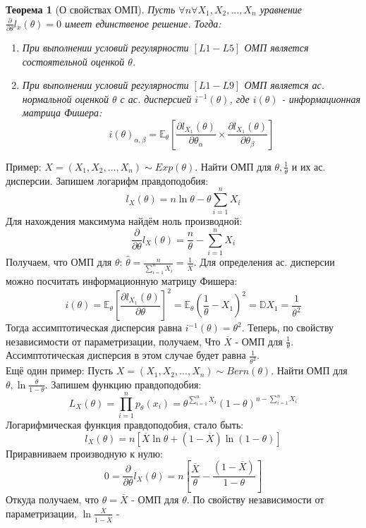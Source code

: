 \documentclass[a4paper,12pt]{article}
\newcommand{\expec}{\mathbb{E}}
\newcommand{\disp}{\mathbb{D}}
\newcommand{\sumin}{\sum\limits_{i=1}^n}
\newcommand{\prodin}{\prod\limits_{i=1}^n}
\newcommand{\sample}{X_1, X_2, ..., X_n}
\newcommand{\derb}[1]{\frac{\partial}{\partial #1}}
\theoremstyle{named}
\newtheorem*{namedtheorem}{Теорема}
\begin{document}
\begin{namedtheorem}[О свойствах ОМП]
    Пусть $\forall n \forall \sample$ уравнение $\derb{\theta} l_x(\theta) = 0$ имеет единственое решение. Тогда:
    \begin{enumerate}
        \item При выполнении условий регулярности $[L1-L5]$ ОМП является состоятельной оценкой $\theta$. 
        \item При выполнении условий регулярности $[L1-L9]$ ОМП является ас. нормальной оценкой $\theta$ с ас. дисперсией $i^{-1}(\theta)$, 
        где $i(\theta)$ - информационная матрица Фишера:
        $$
            i(\theta)_{\alpha, \beta} = \expec_\theta\left[\frac{\partial l_{X_1}(\theta)}{\partial \theta_\alpha} \times \frac{\partial l_{X_1}(\theta)}{\partial \theta_\beta}\right]
        $$
    \end{enumerate}
\end{namedtheorem}
Пример: $X = (\sample) \sim Exp(\theta)$. Найти ОМП для $\theta, \frac{1}{\theta}$ и их ас. дисперсии. Запишем логарифм правдоподобия:
$$
    l_X(\theta) = n\ln \theta - \theta \sumin X_i 
$$
Для нахождения максимума найдём ноль производной:
$$
    \derb{\theta} l_X(\theta) = \frac{n}{\theta} - \sumin X_i
$$
Получаем, что ОМП для $\theta$: $\hat\theta = \frac{n}{\sumin X_i} = \frac{1}{\overline{X}}$. Для определения ас. дисперсии 
можно посчитать информационную матрицу Фишера:
$$
    i(\theta) = \expec_\theta\left[\frac{\partial l_{X_1}(\theta)}{\partial \theta}\right]^2 = \expec_\theta\left(\frac{1}{\theta} - X_1\right)^2 = \disp X_1 = \frac{1}{\theta^2}
$$
Тогда ассимптотическая дисперсия равна $i^{-1}(\theta) = \theta^2$. Теперь, по свойству независимости от параметризации, получаем, Что
$\overline{X}$ - ОМП для $\frac{1}{\theta}$. Ассимптотическая дисперсия в этом случае будет равна $\frac{1}{\theta^2}$. \\ 
Ещё один пример: Пусть $X = (\sample) \sim Bern(\theta)$. Найти ОМП для $\theta, \ln \frac{\theta}{1-\theta}$. Запишем функцию правдоподобия:
$$
    L_X(\theta) = \prodin p_\theta(x_i) = \theta^{\sumin X_i} (1-\theta)^{n-\sumin X_i}
$$
Логарифмическая функция правдоподобия, стало быть:
$$
    l_X(\theta) = n\left[\overline{X} \ln \theta + (1-\overline{X})\ln (1-\theta)\right]
$$
Приравниваем производную к нулю:
$$
    0 = \derb{\theta} l_X(\theta) = n\left[\frac{\overline{X}}{\theta} - \frac{(1-\overline{X})}{1-\theta}\right]
$$
Откуда получаем, что $\theta = \overline{X}$ - ОМП для $\theta$. По свойству независимости от параметризации, $\ln\frac{\overline{X}}{1-\overline{X}}$ -
\end{document}
